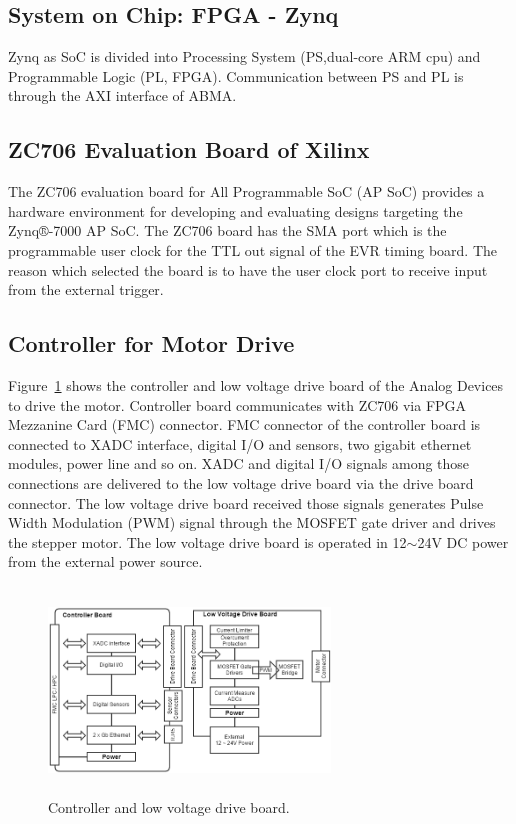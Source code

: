 \documentclass[a4paper,
              ]{jacow}
\begin{document}
\subsection{System on Chip: FPGA - Zynq}
Zynq\cite{xilix,zynq} as SoC is divided into Processing System (PS,dual-core ARM cpu) and  Programmable Logic (PL, FPGA). Communication between PS and PL is through the AXI interface of ABMA.

\subsection{ZC706 Evaluation Board of Xilinx}
The ZC706 evaluation board for All Programmable SoC (AP SoC) provides a hardware environment for developing and evaluating designs targeting the Zynq®-7000 AP SoC.\cite{zc706-doc} The ZC706 board has the SMA port which is the programmable user clock for the TTL out signal of the EVR timing board. The reason which selected the board is to have the user clock port to receive input from the external trigger.

\subsection{Controller for Motor Drive}
Figure~\ref{controller} shows the controller and low voltage drive board of the Analog Devices to drive the motor. Controller board communicates with ZC706 via FPGA Mezzanine Card (FMC) connector. FMC connector of the controller board is connected to XADC interface, digital I/O and sensors, two gigabit ethernet modules, power line and so on. XADC and digital I/O signals among those connections are delivered to the low voltage drive board via the drive board connector. The low voltage drive board received those signals generates Pulse Width Modulation (PWM) signal through the MOSFET gate driver and drives the stepper motor. The low voltage drive board is operated in 12${\sim}$24V DC power from the external power source.

\begin{figure}[!htb]
	\centering
	\includegraphics*[width=75mm, height=55mm]{WEPGF124f2}
	\caption{Controller and low voltage drive board.}
	\label{controller}
\end{figure}
\end{document}
